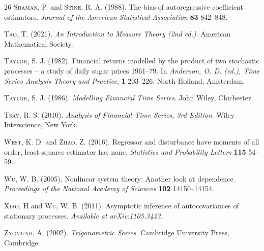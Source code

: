 \documentclass[ejsv2]{imsart}
\theoremstyle{plain}
\theoremstyle{definition}
\theoremstyle{remark}
\begin{document}
\begin{thebibliography}{26}
\textsc{Shaman, P.} and \textsc{Stine, R. A.} (1988). The bias of autoregressive coefficient estimators. \textit{Journal of the American Statistical Association}
\textbf{83} 842--848.

\textsc{Tao, T.} (2021). \textit{
An Introduction to Measure Theory (2nd ed.)}. American Mathematical Society.




\textsc{Taylor, S. J.} (1982). Financial returns modelled by the product of two stochastic processes
  -- a study of daily sugar prices 1961--79. In \textit{Anderson, O. D. (ed.), Time Series Analysis Theory and
  Practice}, \textbf{1} 203--226. North-Holland, Amsterdam.

\textsc{Taylor, S. J.} (1986). \textit{Modelling Financial Time Series}. John Wiley, Chichester.


\textsc{Tsay, R. S.} (2010). \textit{Analysis of Financial Time Series, 3rd Edition}. Wiley Interscience, New York.

\textsc{West, K. D.} and \textsc{Zhao, Z.} (2016). Regressor and disturbance have moments of all order, least squares estimator has none. \textit{Statistics and Probability Letters}
\textbf{115} 54--59.

\textsc{Wu, W. B.} (2005). Nonlinear system theory: Another look at dependence. \textit{Proceedings of the National Academy of Sciences} \textbf{102} 14150--14154.

\textsc{Xiao, H} and \textsc{Wu, W. B.} (2011). Asymptotic inference of autocovariances of stationary processes. \textit{Available at arXiv:1105.3423.}

\textsc{Zygmund, A.} (2002). \textit{Trigonometric Series}. Cambridge University Press, Cambridge.


\end{thebibliography}
\end{document}
